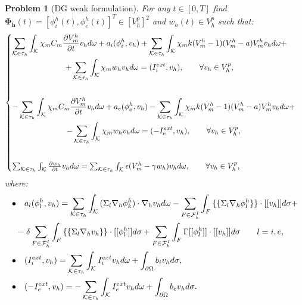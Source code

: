 \documentclass[a4paper,11pt]{article}
\newtheorem{problem}{Problem}
\begin{document}
    \begin{problem}[DG weak formulation]
    For any $t\in[0,T]$ find $\bm{\Phi_h}(t)=[\phi_i^h(t),\phi_e^h(t)]^T \in [V_h^p]^2$  and  $w_h(t) \in V_h^p$ such that:
    \begin{equation*}
    \begin{cases}
    \begin{gathered}
    \sum_{\mathcal{K} \in \tau_h} \int_{\mathcal{K}}{ \chi_m C_m \pdv{V_m^h}{t} v_h d\omega}+a_i(\phi_i^h,v_h)+\sum_{\mathcal{K} \in \tau_h} \int_{\mathcal{K}}{ \chi_m k (V_m^h-1)(V_m^h-a) V_m^h v_h d\omega}+\\
    +\sum_{\mathcal{K} \in \tau_h} \int_{\mathcal{K}}{ \chi_m w_h v_h d\omega}=(I_i^{ext},v_h), \qquad \forall v_h \in V_h^p,\\
    \vspace{2mm}
    \end{gathered}\\
    \begin{gathered}
    -\sum_{\mathcal{K} \in \tau_h} \int_{\mathcal{K}}{ \chi_m C_m \pdv{V_m^h}{t} v_h d\omega}+a_e(\phi_e^h,v_h)-\sum_{\mathcal{K} \in \tau_h} \int_{\mathcal{K}}{ \chi_m k (V_m^h-1)(V_m^h-a) V_m^h v_h d\omega}+\\
    -\sum_{\mathcal{K} \in \tau_h} \int_{\mathcal{K}}{ \chi_m w_h v_h d\omega}=(-I_e^{ext},v_h), \qquad \forall v_h \in V_h^p,\\
       \vspace{2mm}
    \end{gathered}\\
    \sum_{\mathcal{K} \in \tau_h} \int_{\mathcal{K}}{\pdv{w_h}{t}v_h d\omega}=\sum_{\mathcal{K} \in \tau_h} \int_{\mathcal{K}}{\epsilon (V_m^h-\gamma w_h) v_h d\omega}, \qquad \forall v_h \in V_h^p,\\
    \end{cases}
    \end{equation*}
    \vspace{5mm}
    where:
    \vspace{3mm}
    \begin{equation}\label{forgamma}
    \begin{aligned}
    \bullet& \quad a_l(\phi_l^h,v_h)=\sum_{\mathcal{K} \in \tau_h} \int_{\mathcal{K}}{(\Sigma_l \nabla_h \phi_k^h) \cdot \nabla_h v_h d\omega}-\sum_{F \in \mathcal{F}_h^I} \int_F { \{\{\Sigma_l \nabla_h \phi_l^h \}\} \cdot [[v_h]] d\sigma}+\\
    &-\delta \sum_{F \in \mathcal{F}_h^I} \int_F{ \{\{\Sigma_l \nabla_h v_h\}\} \cdot [[\phi_l^h]]d\sigma}+\sum_{F \in \mathcal{F}_h^I}\int_F {\Gamma [[\phi_l^h]] \cdot [[v_h]] d\sigma} \qquad l=i,e,\\
    \newline
    \bullet& \quad (I_i^{ext},v_h)=\sum_{\mathcal{K} \in \tau_h} \int_{\mathcal{K}} {I_i^{ext} v_h d\omega}+\int_{\partial \Omega}{b_i v_h d\sigma},\\
    \newline
    \bullet& \quad (-I_e^{ext},v_h)=-\sum_{\mathcal{K} \in \tau_h} \int_{\mathcal{K}} {I_e^{ext} v_h d\omega}+\int_{\partial \Omega}{b_e v_h d\sigma}.
    \end{aligned}
    \end{equation}
    

\end{problem}
\end{document}
